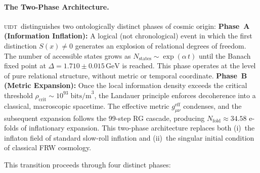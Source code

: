 \documentclass[12pt,a4paper,twoside]{article}
\theoremstyle{plain}
\theoremstyle{definition}
\theoremstyle{remark}
\newcommand{\UIDT}{\textsc{uidt}}
\newcommand{\GeV}{\,\mathrm{GeV}}
\newcommand{\DeltaGap}{1.710 \pm 0.015\GeV}        %
\begin{document}
\paragraph{The Two-Phase Architecture.}
\UIDT\ distinguishes two ontologically distinct phases of cosmic origin:
\textbf{Phase~A (Information Inflation):} A logical (not chronological)
event in which the first distinction $S(x) \neq 0$ generates an explosion
of relational degrees of freedom. The number of accessible states grows
as $N_{\text{states}} \sim \exp(\alpha\, t)$ until the Banach fixed point
at $\Delta = \DeltaGap$ is reached. This phase operates at the level of
pure relational structure, without metric or temporal coordinate.
\textbf{Phase~B (Metric Expansion):} Once the local information density
exceeds the critical threshold $\rho_{\text{crit}} \sim 10^{93}\;\text{bits/m}^3$,
the Landauer principle enforces decoherence into a classical, macroscopic
spacetime. The effective metric $g_{\mu\nu}^{\text{eff}}$ condenses, and
the subsequent expansion follows the 99-step RG cascade, producing
$N_{\text{fold}} \approx 34.58$ e-folds of inflationary expansion.
This two-phase architecture replaces both (i)~the inflaton field of
standard slow-roll inflation and (ii)~the singular initial condition
of classical FRW cosmology.

\vspace{0.3em}
This transition proceeds through four distinct phases:
\end{document}
